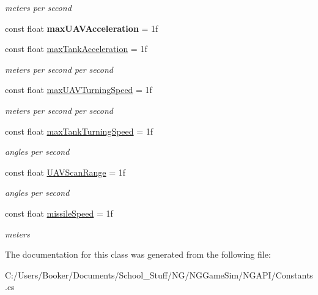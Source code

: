\begin{DoxyCompactItemize}
\begin{DoxyCompactList}\small\item\em meters per second \end{DoxyCompactList}\item 
\mbox{\label{class_n_g_a_p_i_1_1_constants_a627f4e149317a6cccf0aae2a7a1ba503}} 
const float {\bfseries max\+U\+A\+V\+Acceleration} = 1f
\item 
\mbox{\label{class_n_g_a_p_i_1_1_constants_ada80ada2aadbcb2fcf016b650e23c0f7}} 
const float \hyperlink{class_n_g_a_p_i_1_1_constants_ada80ada2aadbcb2fcf016b650e23c0f7}{max\+Tank\+Acceleration} = 1f
\begin{DoxyCompactList}\small\item\em meters per second per second \end{DoxyCompactList}\item 
\mbox{\label{class_n_g_a_p_i_1_1_constants_a01af0064bbfd38969df15efbcc264c5d}} 
const float \hyperlink{class_n_g_a_p_i_1_1_constants_a01af0064bbfd38969df15efbcc264c5d}{max\+U\+A\+V\+Turning\+Speed} = 1f
\begin{DoxyCompactList}\small\item\em meters per second per second \end{DoxyCompactList}\item 
\mbox{\label{class_n_g_a_p_i_1_1_constants_a0bf008e62b8219b78465aa860a87839a}} 
const float \hyperlink{class_n_g_a_p_i_1_1_constants_a0bf008e62b8219b78465aa860a87839a}{max\+Tank\+Turning\+Speed} = 1f
\begin{DoxyCompactList}\small\item\em angles per second \end{DoxyCompactList}\item 
\mbox{\label{class_n_g_a_p_i_1_1_constants_aa95f25ec1623ed235d1ff7339a8d97f7}} 
const float \hyperlink{class_n_g_a_p_i_1_1_constants_aa95f25ec1623ed235d1ff7339a8d97f7}{U\+A\+V\+Scan\+Range} = 1f
\begin{DoxyCompactList}\small\item\em angles per second \end{DoxyCompactList}\item 
\mbox{\label{class_n_g_a_p_i_1_1_constants_a3b2f3ed7cb864e58fe5ae58f83b70451}} 
const float \hyperlink{class_n_g_a_p_i_1_1_constants_a3b2f3ed7cb864e58fe5ae58f83b70451}{missile\+Speed} = 1f
\begin{DoxyCompactList}\small\item\em meters \end{DoxyCompactList}\end{DoxyCompactItemize}


The documentation for this class was generated from the following file\+:\begin{DoxyCompactItemize}
\item 
C\+:/\+Users/\+Booker/\+Documents/\+School\+\_\+\+Stuff/\+N\+G/\+N\+G\+Game\+Sim/\+N\+G\+A\+P\+I/Constants.\+cs\end{DoxyCompactItemize}
